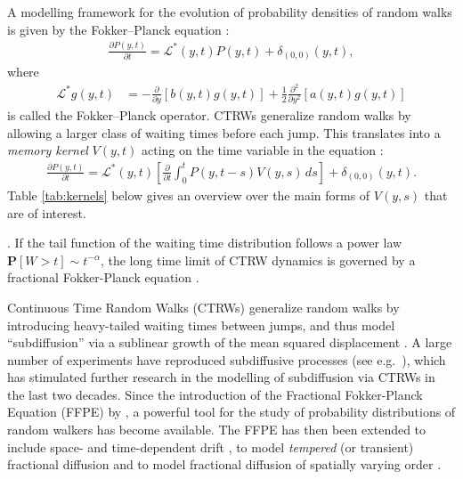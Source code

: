 \documentclass[a4paper,12pt]{elsarticle}
\numberwithin{equation}{section}
\theoremstyle{plain}
\theoremstyle{definition}
\theoremstyle{remark}
\numberwithin{equation}{section}
\newcommand{\1}{\mathbf 1}
\newcommand{\pr}{\mathbf P}
\newcommand{\del}{\partial}
\begin{document}
A modelling framework for the evolution of probability densities of random walks 
is given by the Fokker--Planck equation \citep{gardiner2004handbook}: 
\begin{align}
\frac{\del P(y,t)}{\del t} = \mathcal L^*(y,t) P(y,t) + \delta_{(0,0)}(y,t),
\end{align}
where 
\begin{align}
\mathcal L^* g(y,t)
&= -\frac{\partial }{\partial y}[b(y,t) g(y,t)]
+\frac{1}{2}\frac{\partial^2 }{\partial y^2}[a(y,t) g(y,t)]
\end{align}
is called the Fokker--Planck operator. 
CTRWs generalize random walks by allowing a larger class of waiting times 
before each jump. This translates into a \emph{memory kernel} $V(y,t)$ 
acting on the time variable in the equation \cite{BaeumerStraka16}: 
\begin{align} \label{eq:FFPE}
\frac{\del P(y,t)}{\del t} = \mathcal L^*(y,t) \left[ \frac{\partial}{\partial t}
\int_0^t P(y,t-s) V(y,s)\,ds \right] + \delta_{(0,0)}(y,t).
\end{align}
Table \ref{tab:kernels} below gives an overview over the main forms of 
$V(y,s)$ that are of interest. 






. If the tail function of the waiting time 
distribution follows a power law $\pr[W > t] \sim t^{-\alpha}$, the long 
time limit of CTRW dynamics is governed by a fractional Fokker-Planck 
equation \citep{Metzler2000}. 


Continuous Time Random Walks (CTRWs) \citep{Scher1975} generalize random walks by introducing heavy-tailed waiting times between jumps, and thus model ``subdiffusion'' via a sublinear growth of the mean squared displacement \citep{HLS2010b}.
A large number of experiments have reproduced subdiffusive processes (see e.g.\ ), which has stimulated further research in the modelling of subdiffusion via CTRWs in the last two decades. Since the introduction of the Fractional Fokker-Planck Equation (FFPE) by \cite{BMK00}, a powerful tool for the study of probability distributions of random walkers has become available.
The FFPE has then been extended to include space- and time-dependent drift \citep{HLS10PRL},
to model \emph{tempered} (or transient) fractional diffusion \citep{Gajda2010,StrakaThesis,Zhang2015,Sabzikar2015}
and to model fractional diffusion of spatially varying order
\citep{Chechkin2005a, Straka17}.
\end{document}
